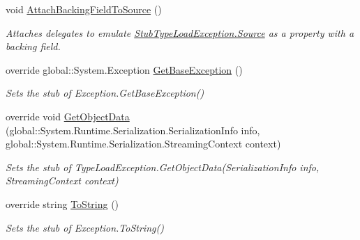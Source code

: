 \begin{DoxyCompactItemize}
void \hyperlink{class_system_1_1_fakes_1_1_stub_type_load_exception_a3d8c54b5e4686a6571b720fb0503b58d}{Attach\-Backing\-Field\-To\-Source} ()
\begin{DoxyCompactList}\small\item\em Attaches delegates to emulate \hyperlink{class_system_1_1_fakes_1_1_stub_type_load_exception_a3296bd508b8b5ecc4410b58b08be3479}{Stub\-Type\-Load\-Exception.\-Source} as a property with a backing field.\end{DoxyCompactList}\item 
override global\-::\-System.\-Exception \hyperlink{class_system_1_1_fakes_1_1_stub_type_load_exception_a38f6386e010047f096d74c0abc3dc8f8}{Get\-Base\-Exception} ()
\begin{DoxyCompactList}\small\item\em Sets the stub of Exception.\-Get\-Base\-Exception()\end{DoxyCompactList}\item 
override void \hyperlink{class_system_1_1_fakes_1_1_stub_type_load_exception_aef7eeb6ac0d9a3b72394579cdef58eee}{Get\-Object\-Data} (global\-::\-System.\-Runtime.\-Serialization.\-Serialization\-Info info, global\-::\-System.\-Runtime.\-Serialization.\-Streaming\-Context context)
\begin{DoxyCompactList}\small\item\em Sets the stub of Type\-Load\-Exception.\-Get\-Object\-Data(\-Serialization\-Info info, Streaming\-Context context)\end{DoxyCompactList}\item 
override string \hyperlink{class_system_1_1_fakes_1_1_stub_type_load_exception_a15f796874b301297460abbaa4272fac1}{To\-String} ()
\begin{DoxyCompactList}\small\item\em Sets the stub of Exception.\-To\-String()\end{DoxyCompactList}\end{DoxyCompactItemize}

